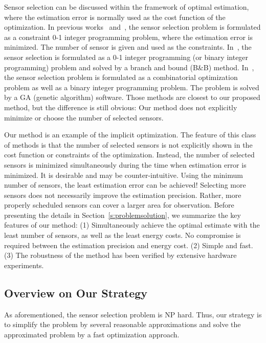 Sensor selection can be discussed within the framework of optimal estimation, where the estimation error is normally used as the cost function of the optimization. In previous works~\cite{SAM2006Amit,Fusion2005Amit,JafariGASensorSelectionInformationSciences2001} and~\cite{UcinskiPatanDoptSensorSelection06}, the sensor selection problem is formulated as a constraint 0-1 integer programming problem, where the estimation error is minimized. The number of sensor is given and used as the constraints. In~\cite{SAM2006Amit}, the sensor selection is formulated as a 0-1 integer programming (or binary integer programming) problem and solved by a branch and bound (B\&B) method. In~\cite{JafariGASensorSelectionInformationSciences2001}, the sensor selection problem is formulated as a combinatorial optimization problem as well as a binary integer programming problem. The problem is solved by a GA (genetic algorithm) software.
 Those methods are closest to our proposed method, but the difference is still obvious: Our method does not explicitly minimize or choose the number of selected sensors.


Our method is an example of the implicit optimization. The feature of this class of methods is that the number of selected sensors is not explicitly shown in the cost function or constraints of the optimization. Instead, the number of selected sensors is minimized simultaneously during the time when estimation error is minimized. It is desirable and may be counter-intuitive. Using the minimum number of sensors, the least estimation error can be achieved! Selecting more sensors does not necessarily improve the estimation precision. Rather, more properly scheduled sensors can cover a larger area for observation. Before presenting the details in Section~\ref{s:problemsolution}, we summarize the key features of our method: (1) Simultaneously achieve the optimal estimate with the least number of sensors, as well as the least energy costs. No compromise is required between the estimation precision and energy cost. (2) Simple and fast. (3) The robustness of the method has been verified by extensive hardware experiments.


\subsection{Overview on Our Strategy}\label{s:big}
    As aforementioned, the sensor selection problem is NP hard. Thus, our strategy is to simplify the problem by several reasonable approximations and solve the approximated problem by a fast optimization approach.


